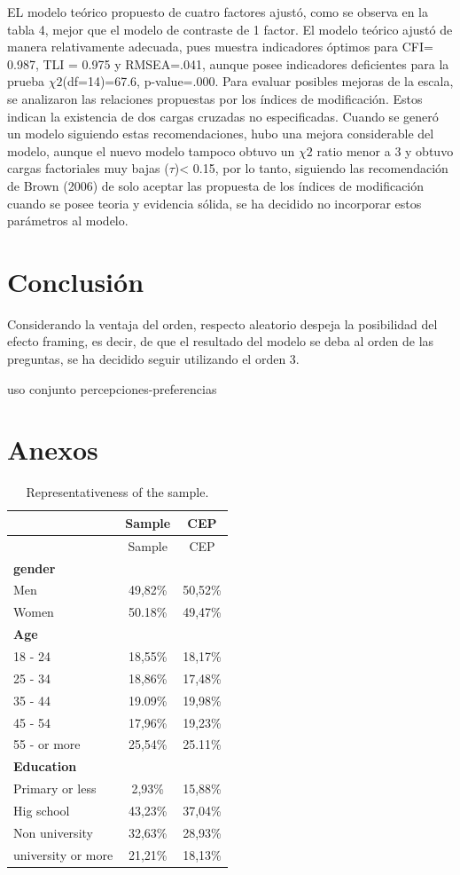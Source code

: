 \documentclass[
]{article}
\begin{document}
EL modelo teórico propuesto de cuatro factores ajustó, como se observa
en la tabla 4, mejor que el modelo de contraste de 1 factor. El modelo
teórico ajustó de manera relativamente adecuada, pues muestra
indicadores óptimos para CFI= 0.987, TLI = 0.975 y RMSEA=.041, aunque
posee indicadores deficientes para la prueba \(\chi2\)(df=14)=67.6,
p-value=.000. Para evaluar posibles mejoras de la escala, se analizaron
las relaciones propuestas por los índices de modificación. Estos indican
la existencia de dos cargas cruzadas no especificadas. Cuando se generó
un modelo siguiendo estas recomendaciones, hubo una mejora considerable
del modelo, aunque el nuevo modelo tampoco obtuvo un \(\chi2\) ratio
menor a 3 y obtuvo cargas factoriales muy bajas (\(\tau\))\textless{}
0.15, por lo tanto, siguiendo las recomendación de Brown (2006) de solo
aceptar las propuesta de los índices de modificación cuando se posee
teoria y evidencia sólida, se ha decidido no incorporar estos parámetros
al modelo.

\hypertarget{conclusiuxf3n}{%
\section{Conclusión}\label{conclusiuxf3n}}

Considerando la ventaja del orden, respecto aleatorio despeja la
posibilidad del efecto framing, es decir, de que el resultado del modelo
se deba al orden de las preguntas, se ha decidido seguir utilizando el
orden 3.

uso conjunto percepciones-preferencias

\pagebreak

\hypertarget{anexos}{%
\section{Anexos}\label{anexos}}

\begin{longtable}[]{@{}lcc@{}}
\caption{Representativeness of the sample.}\tabularnewline
\toprule
& Sample & CEP\tabularnewline
\midrule
\endfirsthead
\toprule
& Sample & CEP\tabularnewline
\midrule
\endhead
\textbf{gender} & &\tabularnewline
Men & 49,82\% & 50,52\%\tabularnewline
Women & 50.18\% & 49,47\%\tabularnewline
\textbf{Age} & &\tabularnewline
18 - 24 & 18,55\% & 18,17\%\tabularnewline
25 - 34 & 18,86\% & 17,48\%\tabularnewline
35 - 44 & 19.09\% & 19,98\%\tabularnewline
45 - 54 & 17,96\% & 19,23\%\tabularnewline
55 - or more & 25,54\% & 25.11\%\tabularnewline
\textbf{Education} & &\tabularnewline
Primary or less & 2,93\% & 15,88\%\tabularnewline
Hig school & 43,23\% & 37,04\%\tabularnewline
Non university & 32,63\% & 28,93\%\tabularnewline
university or more & 21,21\% & 18,13\%\tabularnewline
\bottomrule
\end{longtable}
\end{document}
